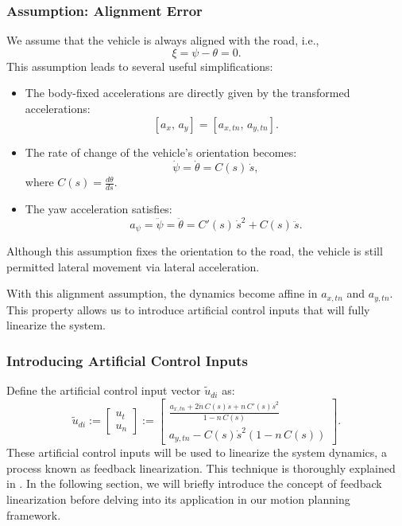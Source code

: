 \subsubsection{Assumption: Alignment Error} \label{subsubsec:alignment_error}
We assume that the vehicle is always aligned with the road, i.e.,
\begin{equation}
	\xi = \psi - \theta = 0.
\end{equation}
This assumption leads to several useful simplifications:
\begin{itemize}
	\item The body-fixed accelerations are directly given by the transformed accelerations:
	      \[
		      [a_x,\, a_y] = [a_{x,tn},\, a_{y,tn}].
	      \]
	\item The rate of change of the vehicle's orientation becomes:
	      \[
		      \dot{\psi} = \dot{\theta} = C(s)\,\dot{s},
	      \]
	      where \(C(s)=\frac{d\theta}{ds}\).
	\item The yaw acceleration satisfies:
	      \[
		      a_\psi = \ddot{\psi} = \ddot{\theta} = C'(s)\,\dot{s}^2 + C(s)\,\ddot{s}.
	      \]
\end{itemize}
Although this assumption fixes the orientation to the road, the vehicle is still permitted lateral movement via lateral acceleration.

With this alignment assumption, the dynamics become affine in \(a_{x,tn}\) and \(a_{y,tn}\).
This property allows us to introduce artificial control inputs that will fully linearize the system.

\subsubsection{Introducing Artificial Control Inputs}

Define the artificial control input vector \(\tilde{u}_{di}\) as:
\begin{equation}
	\label{eq:artificial_controls}
	\tilde{u}_{di} := \begin{bmatrix}
		u_t \\
		u_n
	\end{bmatrix} :=
	\begin{bmatrix}
		\displaystyle \frac{a_{x,tn} + 2\dot{n}\,C(s)\dot{s} + n\,C'(s)\dot{s}^2}{1 - n\,C(s)} \\
		a_{y,tn} - C(s)\dot{s}^2(1 - n\,C(s))
	\end{bmatrix}.
\end{equation}
These artificial control inputs will be used to linearize the system dynamics, a process known as feedback linearization.
This technique is thoroughly explained in \cite{khalil_nonlinear_2002}.
In the following section, we will briefly introduce the concept of feedback linearization before delving into its application in our motion planning
framework.


